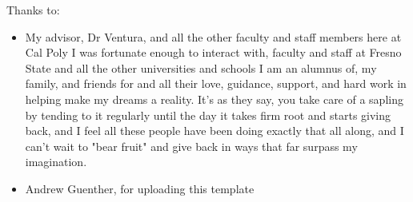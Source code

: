 \noindent
Thanks to:
\begin{itemize}
    \item My advisor, Dr Ventura, and all the other faculty and staff members here at Cal Poly I was fortunate enough to interact with, faculty and staff at Fresno State and all the other universities and schools I am an alumnus of, my family, and friends for and all their love, guidance, support, and hard work in helping make my dreams a reality. It's as they say, you take care of a sapling by tending to it regularly until the day it takes firm root and starts giving back, and I feel all these people have been doing exactly that all along, and I can't wait to "bear fruit" and give back in ways that far surpass my imagination. 
    \item Andrew Guenther, for uploading this template
\end{itemize}
